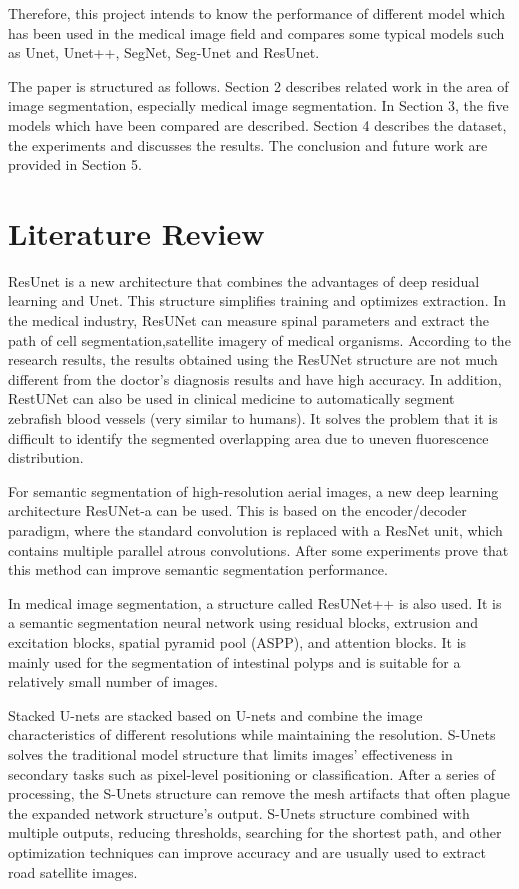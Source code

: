 \documentclass{article}
\begin{document}
Therefore, this project intends to know the performance of different model which has been used in the medical image field and compares some typical models such as Unet, Unet++, SegNet, Seg-Unet and ResUnet.

The paper is structured as follows.
Section 2 describes related work in the area of image segmentation, especially medical image segmentation.
In Section 3, the five models which have been compared are described.
Section 4 describes the dataset, the experiments and discusses the results.
The conclusion and future work are provided in Section 5.


\section{Literature Review}
ResUnet is a new architecture that combines the advantages of deep residual learning and Unet.\cite{zhang2018road}
This structure simplifies training and optimizes extraction. In the medical industry, ResUNet can measure spinal parameters\cite{weng2019artificial} and extract the path of cell segmentation\cite{lessmann2019iterative},satellite imagery of medical organisms.
According to the research results\cite{weng2019artificial}, the results obtained using the ResUNet structure are not much different from the doctor's diagnosis results and have high accuracy.
In addition, RestUNet can also be used in clinical medicine to automatically segment zebrafish blood vessels (very similar to humans). It solves the problem that it is difficult to identify the segmented overlapping area due to uneven fluorescence distribution.\cite{zhang2019zebrafish}

For semantic segmentation of high-resolution aerial images, a new deep learning architecture ResUNet-a can be used.
This is based on the encoder/decoder paradigm, where the standard convolution is replaced with a ResNet unit, which contains multiple parallel atrous convolutions.
After some experiments prove that this method can improve semantic segmentation performance.\cite{diakogiannis2020resunet}

In medical image segmentation, a structure called ResUNet++ is also used.
It is a semantic segmentation neural network using residual blocks, extrusion and excitation blocks, spatial pyramid pool (ASPP), and attention blocks.
It is mainly used for the segmentation of intestinal polyps and is suitable for a relatively small number of images.\cite{jha2019resunet++}

Stacked U-nets are stacked based on U-nets and combine the image characteristics of different resolutions while maintaining the resolution.
S-Unets solves the traditional model structure that limits images' effectiveness in secondary tasks such as pixel-level positioning or classification.\cite{shah2018stacked}
After a series of processing, the S-Unets structure can remove the mesh artifacts that often plague the expanded network structure's output.\cite{ghosh2018stacked}
S-Unets structure combined with multiple outputs, reducing thresholds, searching for the shortest path, and other optimization techniques can improve accuracy and are usually used to extract road satellite images.\cite{sun2018stacked}
\end{document}
